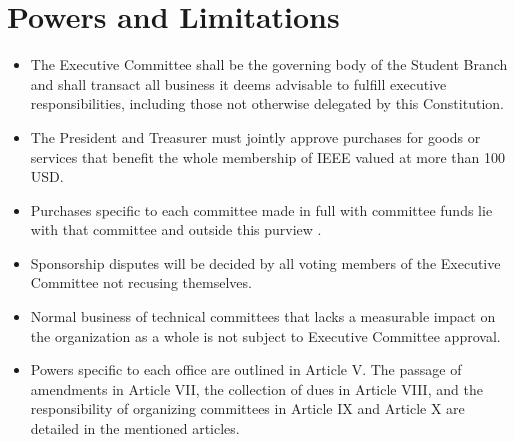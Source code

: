 \documentclass[12pt]{constitution}
\begin{document}
\section{Powers and Limitations}
\label{sec:exec_pow}
\begin{itemize}
    \item The Executive Committee shall be the governing body of the Student Branch and shall transact all business it deems advisable to fulfill executive responsibilities, including those not otherwise delegated by this Constitution.
    \item The President and Treasurer must jointly approve purchases for goods or services that benefit the whole membership of IEEE valued at more than 100 USD.
    \item Purchases specific to each committee made in full with committee funds lie with that committee and outside this purview .
    \item Sponsorship disputes will be decided by all voting members of the Executive Committee not recusing themselves.
    \item Normal business of technical committees that lacks a measurable impact on the organization as a whole is not subject to Executive Committee approval.
    \item Powers specific to each office are outlined in Article V. The passage of amendments in Article VII, the collection of dues in Article VIII, and the responsibility of organizing committees in Article IX and Article X are detailed in the mentioned articles.
\end{itemize}
\end{document}

